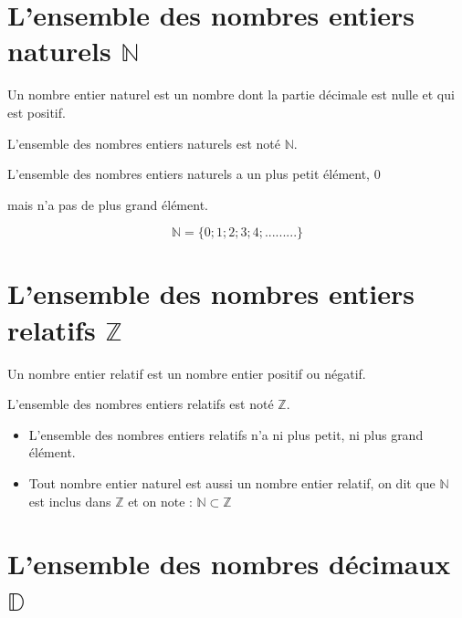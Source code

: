 \begin{pageCours} %


\section{L'ensemble des nombres entiers naturels $\mathbb{N}$}

\begin{Def}
Un nombre entier naturel est un nombre dont la partie décimale est nulle et qui est positif.

L'ensemble des nombres entiers naturels est noté $\mathbb{N}$.
\end{Def}

\begin{Rq}
L'ensemble des nombres entiers naturels a un plus petit élément, 0

mais n'a pas de plus grand élément.

\[\mathbb{N} = \{0;1;2;3;4;.........\}\]
\end{Rq}

\section{L'ensemble des nombres entiers relatifs $\mathbb{Z}$}

\begin{Def}
Un nombre entier relatif est un nombre entier positif ou négatif.

L'ensemble des nombres entiers relatifs est noté $\mathbb{Z}$.
\end{Def}

\begin{Rqs}
\begin{itemize}
\item L'ensemble des nombres entiers relatifs n'a ni plus petit, ni plus grand élément.
\item Tout nombre entier naturel est aussi un nombre entier relatif, on dit que $\mathbb{N}$
est inclus dans $\mathbb{Z}$ et on note : $\mathbb{N}\subset\mathbb{Z}$
\end{itemize}
\end{Rqs}

\section{L'ensemble des nombres décimaux $\mathbb{D}$}


\end{pageCours}
